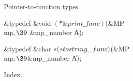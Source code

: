 

Pointer-to-function types.

\Y\B\&{typedef} \&{void} ${}({*}\&{print\_func}){}$(\&{MP} \\{mp}${},\39{}$%
\&{mp\_number} \|A);\par
\fi

\B\&{typedef} \&{char} ${}{*}({*}\\{tostring\_func}){}$(\&{MP} \\{mp}${},%
\39{}$\&{mp\_number} \|A);\par
\fi

Index.
\fi

\inx
\fin
\con
